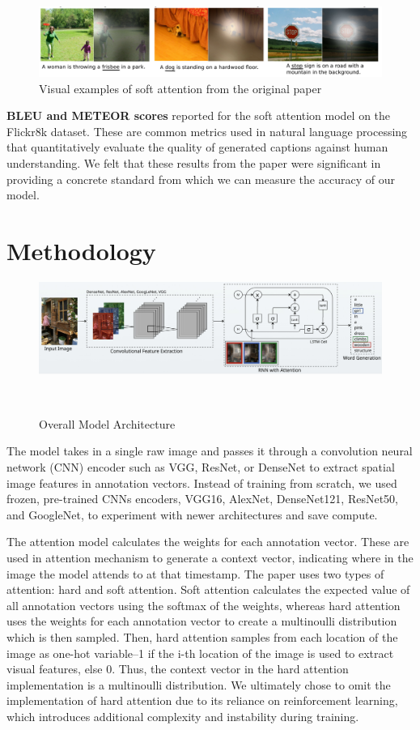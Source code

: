 \documentclass{article}
\begin{document}
\begin{figure}[h]
    \centering
    \includegraphics[width=0.9\linewidth]{chosen-results.png}
    \caption{Visual examples of soft attention from the original paper}
    \label{fig:results}
\end{figure}

\textbf{BLEU and METEOR scores} reported for the soft attention model on the Flickr8k dataset. These are common metrics used in natural language processing that quantitatively evaluate the quality of generated captions against human understanding. We felt that these results from the paper were significant in providing a concrete standard from which we can measure the accuracy of our model.


\section{Methodology}
\begin{figure}[h]
    \centering
    \includegraphics[scale=0.2]{methodology.png}
    \caption{Overall Model Architecture}
    \
\end{figure}
The model takes in a single raw image and passes it through a convolution neural network (CNN) encoder such as VGG, ResNet, or DenseNet to extract spatial image features in annotation vectors. Instead of training from scratch, we used frozen, pre-trained CNNs encoders, VGG16, AlexNet, DenseNet121, ResNet50, and GoogleNet, to experiment with newer architectures and save compute. 

The attention model calculates the weights for each annotation vector. These are used in attention mechanism to generate a context vector, indicating where in the image the model attends to at that timestamp. The paper uses two types of attention: hard and soft attention. Soft attention calculates the expected value of all annotation vectors using the softmax of the weights, whereas hard attention uses the weights for each annotation vector to create a multinoulli distribution which is then sampled. Then, hard attention samples from each location of the image as one-hot variable--1 if the i-th location of the image is used to extract visual features, else 0. Thus, the context vector in the hard attention implementation is a multinoulli distribution. We ultimately chose to omit the implementation of hard attention due to its reliance on reinforcement learning, which introduces additional complexity and instability during training. 
\end{document}
